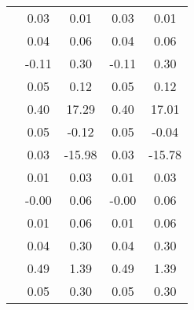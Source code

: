 \begin{table}
\begin{tabular}{c|cc|cc|}
\multicolumn{1}{|c|}{} & \multicolumn{1}{|c|}{      0.03} & \multicolumn{1}{|c|}{      0.01} & \multicolumn{1}{|c|}{      0.03} & \multicolumn{1}{|c|}{      0.01} \\ 
\multicolumn{1}{|c|}{} & \multicolumn{1}{|c|}{      0.04} & \multicolumn{1}{|c|}{      0.06} & \multicolumn{1}{|c|}{      0.04} & \multicolumn{1}{|c|}{      0.06} \\ 
\multicolumn{1}{|c|}{} & \multicolumn{1}{|c|}{     -0.11} & \multicolumn{1}{|c|}{      0.30} & \multicolumn{1}{|c|}{     -0.11} & \multicolumn{1}{|c|}{      0.30} \\ 
\multicolumn{1}{|c|}{} & \multicolumn{1}{|c|}{      0.05} & \multicolumn{1}{|c|}{      0.12} & \multicolumn{1}{|c|}{      0.05} & \multicolumn{1}{|c|}{      0.12} \\ 
\multicolumn{1}{|c|}{} & \multicolumn{1}{|c|}{      0.40} & \multicolumn{1}{|c|}{     17.29} & \multicolumn{1}{|c|}{      0.40} & \multicolumn{1}{|c|}{     17.01} \\ 
\multicolumn{1}{|c|}{} & \multicolumn{1}{|c|}{      0.05} & \multicolumn{1}{|c|}{     -0.12} & \multicolumn{1}{|c|}{      0.05} & \multicolumn{1}{|c|}{     -0.04} \\ 
\multicolumn{1}{|c|}{} & \multicolumn{1}{|c|}{      0.03} & \multicolumn{1}{|c|}{    -15.98} & \multicolumn{1}{|c|}{      0.03} & \multicolumn{1}{|c|}{    -15.78} \\ 
\multicolumn{1}{|c|}{} & \multicolumn{1}{|c|}{      0.01} & \multicolumn{1}{|c|}{      0.03} & \multicolumn{1}{|c|}{      0.01} & \multicolumn{1}{|c|}{      0.03} \\ 
\multicolumn{1}{|c|}{} & \multicolumn{1}{|c|}{     -0.00} & \multicolumn{1}{|c|}{      0.06} & \multicolumn{1}{|c|}{     -0.00} & \multicolumn{1}{|c|}{      0.06} \\ 
\multicolumn{1}{|c|}{} & \multicolumn{1}{|c|}{      0.01} & \multicolumn{1}{|c|}{      0.06} & \multicolumn{1}{|c|}{      0.01} & \multicolumn{1}{|c|}{      0.06} \\ 
\multicolumn{1}{|c|}{} & \multicolumn{1}{|c|}{      0.04} & \multicolumn{1}{|c|}{      0.30} & \multicolumn{1}{|c|}{      0.04} & \multicolumn{1}{|c|}{      0.30} \\ 
\multicolumn{1}{|c|}{} & \multicolumn{1}{|c|}{      0.49} & \multicolumn{1}{|c|}{      1.39} & \multicolumn{1}{|c|}{      0.49} & \multicolumn{1}{|c|}{      1.39} \\ 
\multicolumn{1}{|c|}{} & \multicolumn{1}{|c|}{      0.05} & \multicolumn{1}{|c|}{      0.30} & \multicolumn{1}{|c|}{      0.05} & \multicolumn{1}{|c|}{      0.30} \\ 

\end{tabular}
\end{table}
